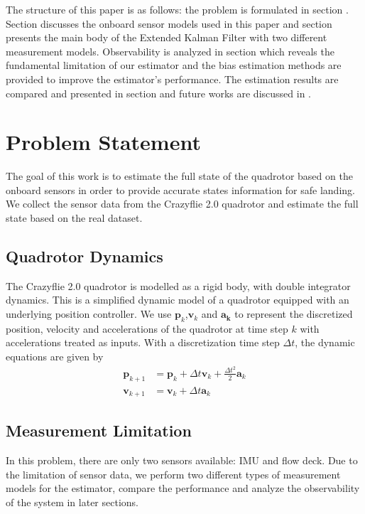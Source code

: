 \documentclass[letterpaper, 10 pt, conference]{ieeeconf}  %
\newcommand{\rom}[1]{\uppercase\expandafter{\romannumeral #1\relax}}
\begin{document}
The structure of this paper is as follows: the problem is formulated in section \rom{2}. Section \rom{3} discusses the onboard sensor models used in this paper and section \rom{4} presents the main body of the Extended Kalman Filter with two different measurement models. Observability is analyzed in section \rom{5} which reveals the fundamental limitation of our estimator and the bias estimation methods are provided to improve the estimator's performance. The estimation results are compared and presented in section \rom{6} and future works are discussed in \rom{7}. 


\section{Problem Statement}   
The goal of this work is to estimate the full state of the quadrotor based on the onboard sensors in order to provide accurate states information for safe landing. We collect the sensor data from the Crazyflie 2.0 quadrotor and estimate the full state based on the real dataset. 
\subsection{Quadrotor Dynamics}
The Crazyflie 2.0 quadrotor is modelled as a rigid body, with double integrator dynamics. This is a simplified dynamic model of a quadrotor equipped with an underlying position controller. We use $\bm{p}_k$,$\bm{v}_k$ and $\bm{a_k}$ to represent the discretized position, velocity and accelerations of the quadrotor at time step $k$ with accelerations treated as inputs. With a discretization time step $\Delta t$, the dynamic equations are given by
\begin{equation}
\begin{split}
\bm{p}_{k+1}&=\bm{p}_{k}+\Delta t\bm{v}_k +\frac{\Delta t^2}{2}\bm{a}_k   \\
\bm{v}_{k+1}&=\bm{v}_{k}+\Delta t \bm{a}_k
\end{split}
\end{equation}  
\subsection{Measurement Limitation}
In this problem, there are only two sensors available: IMU and flow deck. Due to the limitation of sensor data, we perform two different types of measurement models for the estimator, compare the performance and analyze the observability of the system in later sections.
\end{document}
